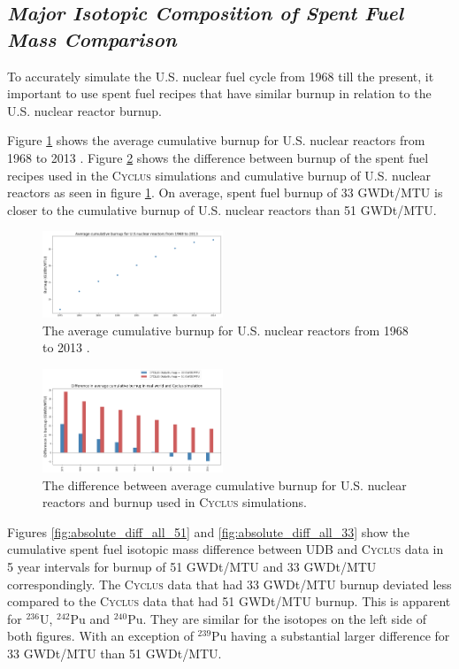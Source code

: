 \documentclass{anstrans}
\newcommand{\Cyclus}{\textsc{Cyclus}\xspace}%
\begin{document}
\subsection{\textit{Major Isotopic Composition of  Spent Fuel Mass Comparison}}
To accurately simulate the U.S. nuclear fuel cycle from 1968 till the present, 
it important to use spent fuel recipes that have similar burnup in relation to 
the U.S. nuclear reactor burnup. 

Figure \ref{fig:burn_up_real} shows the average cumulative burnup for U.S. 
nuclear reactors from 1968 to 2013 \cite{eia_spent_2015}. Figure 
\ref{fig:burn_up_difference} shows the difference between burnup of the spent 
fuel recipes used in the \Cyclus simulations and cumulative burnup of U.S. 
nuclear reactors as seen in figure \ref{fig:burn_up_real}. On average, spent 
fuel burnup of 33 GWDt/MTU is closer to the cumulative burnup of U.S. nuclear 
reactors than 51 GWDt/MTU. 

\begin{figure}[t] %
	\centering
	\includegraphics[width=0.48\textwidth]{figures/burn_up_real}
	\caption{The average cumulative burnup for U.S. nuclear reactors from 1968 to 2013 \cite{eia_spent_2015}.}
	\label{fig:burn_up_real}
\end{figure} 

\begin{figure}[t] %
	\centering
	\includegraphics[width=0.48\textwidth]{figures/burn_up_difference}
	\caption{The difference between average cumulative burnup for U.S. nuclear reactors and burnup used in \Cyclus simulations.}
	\label{fig:burn_up_difference}
\end{figure} 

Figures \ref{fig:absolute_diff_all_51} and \ref{fig:absolute_diff_all_33} show 
the cumulative spent fuel isotopic mass difference between UDB and \Cyclus data 
in 5 year intervals for burnup of 51 GWDt/MTU and 33 GWDt/MTU correspondingly. 
The \Cyclus data that had 33 GWDt/MTU burnup deviated less compared to the 
\Cyclus data that had 51 GWDt/MTU burnup. This is apparent for $^{236}$U, 
$^{242}$Pu and $^{240}$Pu. They are similar for the isotopes on the left side 
of both figures. With an exception of $^{239}$Pu having a substantial larger 
difference for 33 GWDt/MTU than 51 GWDt/MTU. 
\end{document}
